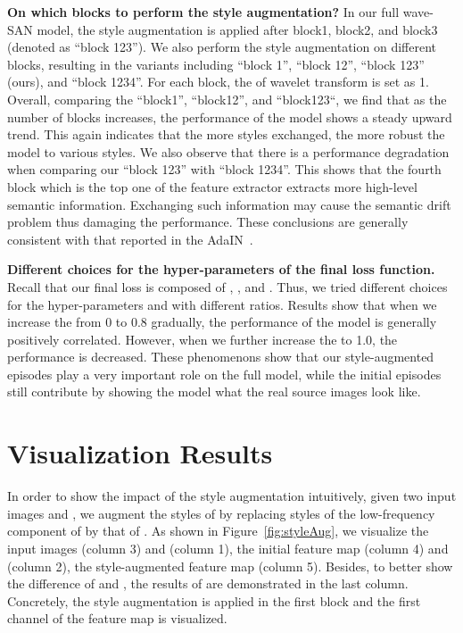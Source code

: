 \documentclass{article}
\begin{document}
	\noindent\textbf{On which blocks to perform the style augmentation?} In our full wave-SAN model, the style augmentation is applied after block1, block2, and block3 (denoted as ``block 123''). We also perform the style augmentation on different blocks, resulting in the variants including ``block 1'', ``block 12'', ``block 123'' (ours), and ``block 1234''. For each block, the  of wavelet transform is set as 1. Overall, comparing the ``block1'', ``block12'', and ``block123``, we find that as the number of blocks increases, the performance of the model shows a steady upward trend. This again indicates that the more styles exchanged, the more robust the model to various styles. We also observe that there is a performance degradation when comparing our ``block 123'' with ``block 1234''. This shows that the fourth block which is the top one of the feature extractor extracts more high-level semantic information. Exchanging such information may cause the semantic drift problem thus damaging the performance. These conclusions are generally consistent with that reported in the AdaIN~\cite{huang2017arbitrary}.
	
	\noindent\textbf{Different choices for the hyper-parameters of the final loss function.} Recall that our final loss is composed of , , and . Thus, we tried different choices for the hyper-parameters  and  with different ratios. Results show that when we increase the  from 0 to 0.8 gradually, the performance of the model is generally positively correlated. However, when we further increase the  to 1.0, the performance is decreased. These phenomenons show that our style-augmented episodes play a very important role on the full model, while the initial episodes still contribute by showing the model what the real source images look like.




\section{Visualization Results}
In order to show the impact of the style augmentation intuitively, given two input images  and , we augment the styles of  by replacing styles of the low-frequency component of  by that of . As shown in Figure~\ref{fig:styleAug}, we visualize the input images  (column 3) and  (column 1), the initial feature map  (column 4) and  (column 2), the style-augmented feature map  (column 5). Besides, to better show the difference of  and , the results of  are demonstrated in the last column.  Concretely, the style augmentation is applied in the first block and the first channel of the feature map is visualized. 
\end{document}
